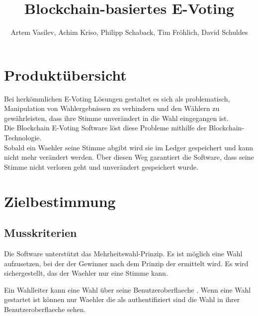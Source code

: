 \documentclass[parskip=full,11pt,twoside]{scrartcl}
\title{Blockchain-basiertes E-Voting}
\author{Artem Vasilev, Achim Kriso, Philipp Schaback, Tim Fröhlich, David Schuldes}
\begin{document}
\maketitle

\pagebreak

\tableofcontents
\pagebreak
\section{Produktübersicht}

Bei herkömmlichen E-Voting Lösungen gestaltet es sich als problematisch, Manipulation von Wahlergebnissen zu verhindern und den Wählern zu gewährleisten, dass ihre Stimme unverändert in die Wahl eingegangen ist. \\
Die Blockchain E-Voting Software löst diese Probleme mithilfe der Blockchain-Technologie. \\
Sobald ein \gls{Waehler} seine \gls{Stimme} abgibt wird sie im \gls{Ledger} gespeichert und kann nicht mehr verändert werden. Über diesen Weg garantiert die Software, dass seine \gls{Stimme} nicht verloren geht und unverändert gespeichert wurde.

\section{Zielbestimmung}

\subsection{Musskriterien}

Die Software unterstützt das Mehrheitswahl-Prinzip. Es ist möglich eine \gls{Wahl} aufzusetzen, bei der der Gewinner nach dem Prinzip der 
 ermittelt wird. 
Es wird sichergestellt, das der \gls{Waehler} nur eine Stimme  kann.

Ein \gls{Wahlleiter} kann eine \gls{Wahl} über seine \gls{Benutzeroberflaeche} .
Wenn eine \gls{Wahl} gestartet ist können nur \gls{Waehler} die als  authentifiziert sind die \gls{Wahl} in ihrer \gls{Benutzeroberflaeche} sehen.
\end{document}
